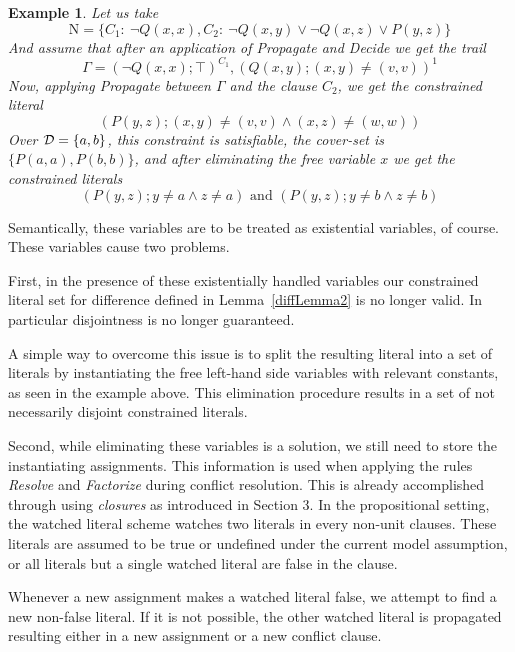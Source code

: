 \documentclass[a4paper]{article}
\newtheorem{example}[defi]{Example}
\newcommand\exClauseNo[1]{C_{#1}} \newcommand{\rst}[1]{|_{#1}}
\begin{document}
\begin{example}\label{freeVarEx}
Let us take
\[ \text{N} = \{
\exClauseNo{1}:~\neg Q(x,x), 
\exClauseNo{2}:~\neg Q(x,y) \lor \neg Q(x,z) \lor P(y,z)
\}
\]
And assume that after an application of \emph{Propagate} and \emph{Decide} we get the trail
\[
\Gamma = (\neg Q(x,x); \top)^{\exClauseNo{1}}, (Q(x,y); (x,y) \ne (v,v))^1
\]
Now, applying \emph{Propagate} between $\Gamma$ and the clause $\exClauseNo{2}$, we get the constrained literal
\[(P(y,z); (x,y) \ne (v,v) \land (x,z) \ne (w,w))\]
Over $\mathcal{D} = \{a,b\}$, this constraint is satisfiable, 
the cover-set is $\{P(a,a), P(b,b)\}$, and after eliminating the free variable $x$ we get the constrained literals
\[(P(y,z); y \ne a \land z \ne a)\text{ and }(P(y,z); y \ne b \land z \ne b)\]
\end{example}

Semantically, these variables are to be treated as existential variables, of course. 
These variables cause two problems. 

First, in the presence of these existentially handled variables 
our constrained literal set for difference defined in Lemma~\ref{diffLemma2} is no longer valid. 
In particular disjointness is no longer guaranteed. 

A simple way to overcome this issue is to split the resulting literal into a set of literals by instantiating 
the free left-hand side variables with relevant constants, as seen in the example above. 
This elimination procedure results in a set of not necessarily disjoint constrained literals.

Second, while eliminating these variables is a solution, we still need to store the instantiating assignments.
This information is used 
when applying the rules \emph{Resolve} and \emph{Factorize} during conflict resolution.
This is already accomplished through using \emph{closures} as introduced in Section 3.
In the propositional setting, the watched literal scheme watches two literals in every non-unit clauses. 
These literals are assumed to be true or undefined under the current model assumption, or all literals but a single watched literal are false in the clause.

Whenever a new assignment makes a watched literal false, 
we attempt to find a new non-false literal. 
If it is not possible, the other watched literal is propagated resulting either in a new assignment or a new conflict clause.
\end{document}
